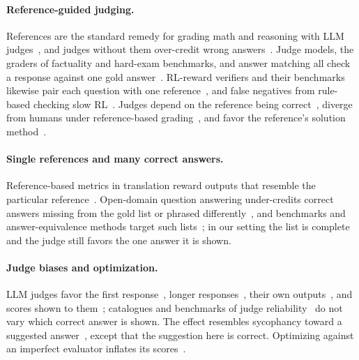 \documentclass{article}
\begin{document}
\paragraph{Reference-guided judging.}
References are the standard remedy for grading math and reasoning with LLM judges~\citep{zheng2023judging,refguided2024,chen2026rethinking}, and judges without them over-credit wrong answers~\citep{generous2026}. Judge models, the graders of factuality and hard-exam benchmarks, and answer matching all check a response against one gold answer~\citep{zhu2023judgelm,kim2024prometheus,wei2024simpleqa,wei2025browsecomp,phan2025hle,chandak2025answermatching}. RL-reward verifiers and their benchmarks likewise pair each question with one reference~\citep{chen2025xverify,liu2025compassverifier,yan2025verifybench}, and false negatives from rule-based checking slow RL~\citep{xu2025tinyv,huang2025pitfalls}.
Judges depend on the reference being correct~\citep{judgingref2026,krumdick2025nofreelabels}, diverge from humans under reference-based grading~\citep{thakur2024judging}, and favor the reference's solution method~\citep{fixation2025}.

\paragraph{Single references and many correct answers.}
Reference-based metrics in translation reward outputs that resemble the particular reference~\citep{freitag2020bleu,fomicheva2016reference}. Open-domain question answering under-credits correct answers missing from the gold list or phrased differently~\citep{min2020ambigqa,si2021whatsinaname,bulian2022tomayto,kamalloo2023evaluating}, and benchmarks and answer-equivalence methods target such lists~\citep{amouyal2022qampari,li2024pedants}; in our setting the list is complete and the judge still favors the one answer it is shown.

\paragraph{Judge biases and optimization.}
LLM judges favor the first response~\citep{wang2024fair}, longer responses~\citep{dubois2024lengthcontrolled}, their own outputs~\citep{panickssery2024llm}, and scores shown to them~\citep{kapetanovic2026anchoring}; catalogues and benchmarks of judge reliability~\citep{koo2024benchmarking,ye2025justice,tan2025judgebench} do not vary which correct answer is shown. The effect resembles sycophancy toward a suggested answer~\citep{sharma2023sycophancy,turpin2023unfaithful}, except that the suggestion here is correct. Optimizing against an imperfect evaluator inflates its scores~\citep{gao2022scaling,rafailov2024scaling}.
\end{document}
